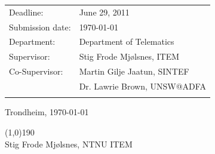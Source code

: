 \begin{titlepage}
\begin{center}
{{\begin{tabular}{p{15cm}}
\end{tabular}  }}

\begin{tabular}{ p{4cm} p{11cm}}
Deadline: & June 29, 2011\\
Submission date: & \today\\
Department: & Department of Telematics\\
Supervisor: & Stig Frode Mj{\o}lsnes, ITEM\\
Co-Supervisor: & Martin Gilje Jaatun, SINTEF\\
 & Dr. Lawrie Brown, UNSW@ADFA\\\\
\end{tabular}
\vspace{0.5cm}

Trondheim, \today 

\vspace{1cm}
\line(1,0){190} \\
Stig Frode Mj{\o}lsnes, NTNU ITEM

\end{center}
\end{titlepage}

